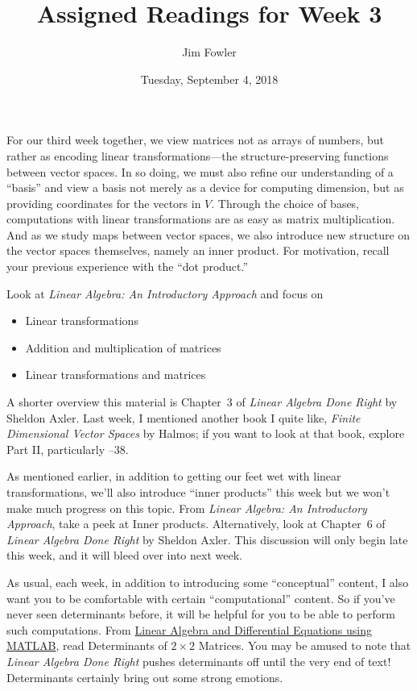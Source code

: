 \documentclass{homework}
\author{Jim Fowler}
\title{Assigned Readings for Week 3}
\date{Tuesday, September 4, 2018}
\begin{document}
\maketitle

For our third week together, we view matrices not as arrays of
numbers, but rather as encoding linear transformations---the
structure-preserving functions between vector spaces.  In so doing, we
must also refine our understanding of a ``basis'' and view a basis not
merely as a device for computing dimension, but as providing
coordinates for the vectors in $V$.  Through the choice of bases,
computations with linear transformations are as easy as matrix
multiplication.  And as we study maps between vector spaces, we also
introduce new structure on the vector spaces themselves, namely an
inner product.  For motivation, recall your previous experience with
the ``dot product.''

Look at \textit{Linear Algebra: An Introductory Approach} and focus on
\begin{itemize}
\item {} Linear transformations
\item {} Addition and multiplication of matrices
\item {} Linear transformations and matrices
\end{itemize}
A shorter overview this material is Chapter~3 of \textit{Linear
  Algebra Done Right} by Sheldon Axler.  Last week, I mentioned
another book I quite like, \textit{Finite Dimensional Vector Spaces}
by Halmos; if you want to look at that book, explore Part II,
particularly --38.

As mentioned earlier, in addition to getting our feet wet with linear
transformations, we'll also introduce ``inner products'' this week but we won't make much progress on this topic.
From \textit{Linear Algebra: An Introductory Approach}, take a peek at
 Inner products.  Alternatively, look at Chapter~6 of
\textit{Linear Algebra Done Right} by Sheldon Axler.  This discussion
will only begin late this week, and it will bleed over into next week.

As usual, each week, in addition to introducing some ``conceptual''
content, I also want you to be comfortable with certain
``computational'' content.  So if you've never seen determinants
before, it will be helpful for you to be able to perform such
computations.  From
\href{/courses/43735/files/folder/textbooks}{Linear Algebra and
  Differential Equations using MATLAB}, read 
Determinants of $2\times 2$ Matrices.  You may be amused to note that
\textit{Linear Algebra Done Right} pushes determinants off until the
very end of text!  Determinants certainly bring out some strong
emotions.
\end{document}

